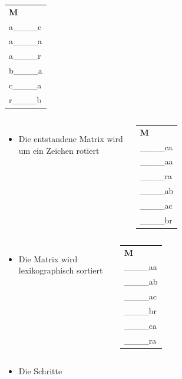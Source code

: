 \documentclass[14pt,xcolor=dvipsnames,pdftex]{beamer}
\begin{document}
\begin{frame}[allowframebreaks]
\begin{columns}[c,onlytextwidth]
    \begin{tabular}{T}
    \textbf{M} \\
    {\color{blue}a}\_\_\_\_c\\
    {\color{blue}a}\_\_\_\_a\\
    {\color{blue}a}\_\_\_\_r\\
    {\color{blue}b}\_\_\_\_a\\
    {\color{blue}c}\_\_\_\_a\\
    {\color{blue}r}\_\_\_\_b\\
    \end{tabular}
\end{columns}
\framebreak
\begin{columns}[c,onlytextwidth]
 \begin{itemize}
  \item Die entstandene Matrix wird um ein Zeichen rotiert
 \end{itemize}
 \begin{tabular}{T}
    \textbf{M} \\
    \_\_\_\_c{\color{blue}a}\\
    \_\_\_\_a{\color{blue}a}\\
    \_\_\_\_r{\color{blue}a}\\
    \_\_\_\_a{\color{blue}b}\\
    \_\_\_\_a{\color{blue}c}\\
    \_\_\_\_b{\color{blue}r}
  \end{tabular}
\end{columns}
\framebreak
\begin{columns}[c,onlytextwidth]
 \begin{itemize}
  \item Die Matrix wird lexikographisch sortiert
 \end{itemize}
 \begin{tabular}{T}
    \textbf{M} \\
    \_\_\_\_aa\\
    \_\_\_\_ab\\
    \_\_\_\_ac\\
    \_\_\_\_br\\
    \_\_\_\_ca\\
    \_\_\_\_ra
  \end{tabular}
\end{columns}
\framebreak
\begin{itemize}
 \item Die Schritte

\end{itemize}
\end{frame}
\end{document}
